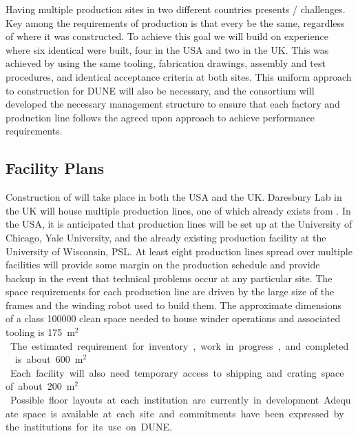 Having multiple  production sites in two different countries presents / challenges. Key among the requirements of production is that every  be the same, regardless of where it was constructed. To achieve this goal we will build on  experience where six identical  were built, four in the USA and two in the UK. This was achieved by using the same tooling, fabrication drawings, assembly and test procedures, and identical acceptance criteria at both sites.  This uniform approach to construction for DUNE will also be necessary, and the  consortium will developed the necessary management structure to ensure that each factory and production line follows the agreed upon approach to achieve  performance requirements.


\subsection{Facility Plans}
\label{sec:fdsp-apa-facility}

Construction of   will take place in both the USA and the UK. Daresbury Lab in the UK will house multiple production lines, one of which already exists from . In the USA, it is anticipated that production lines will be set up at the University of Chicago, Yale University, and the already existing production facility at the University of Wisconsin, PSL. At least eight  production lines spread over multiple facilities will provide some margin on the production schedule and provide backup in the event that technical problems occur at any particular site. 
The space requirements for each production line are driven by the large size of the  frames and the winding robot used to build them. The approximate dimensions of a class \num{100000} clean space needed to house winder operations and associated tooling is \SI{175}{m$^2$}. The estimated requirement for inventory, work in progress, and completed  is about \SI{600}{m$^2$}. Each facility will also need temporary access to shipping and crating space of about \SI{200}{m$^2$}. Possible floor layouts at each institution are currently in development. Adequate space is available at each site and commitments have been expressed by the institutions for its use on DUNE. 


